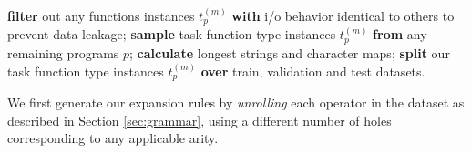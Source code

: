 \documentclass{article}
\begin{document}
\begin{algorithm}
\begin{algorithmic}
        \State \textbf{filter} out any functions instances $t^{(m)}_p$ \textbf{with} i/o behavior identical to others to prevent data leakage;
        \State \textbf{sample} task function type instances $t^{(m)}_p$ \textbf{from} any remaining programs $p$;
        \State \textbf{calculate} longest strings and character maps;
        \State \textbf{split} our task function type instances $t^{(m)}_p$ \textbf{over} train, validation and test datasets.
    \end{algorithmic} 
\end{algorithm}


We first generate our expansion rules by \emph{unrolling} each operator in the dataset
as described in Section \ref{sec:grammar},
using a different number of holes corresponding to any applicable arity.

\end{document}
